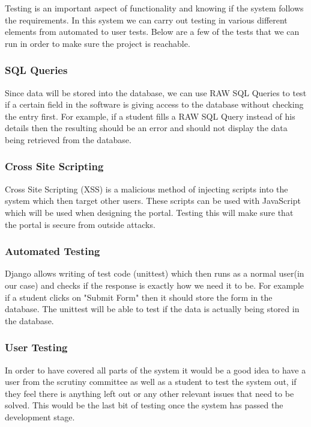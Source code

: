 \documentclass[../main.tex]{subfiles}
\begin{document}
\raggedright

Testing is an important aspect of functionality and knowing if the system follows the requirements. In this system we can carry out testing in various different elements from automated to user tests. Below are a few of the tests that we can run in order to make sure the project is reachable.

\subsubsection{SQL Queries}
Since data will be stored into the database, we can use RAW SQL Queries to test if a certain field in the software is giving access to the database without checking the entry first. For example, if a student fills a RAW SQL Query instead of his details then the resulting should be an error and should not display the data being retrieved from the database. 

\subsubsection{Cross Site Scripting}
Cross Site Scripting (XSS) is a malicious method of injecting scripts into the system which then target other users. These scripts can be used with JavaScript which will be used when designing the portal. Testing this will make sure that the portal is secure from outside attacks. 

\subsubsection{Automated Testing}
Django allows writing of test code (unittest)\cite{djangoTesting} which then runs as a normal user(in our case) and checks if the response is exactly how we need it to be. For example if a student clicks on "Submit Form" then it should store the form in the database. The unittest will be able to test if the data is actually being stored in the database. 

\subsubsection{User Testing}
In order to have covered all parts of the system it would be a good idea to have a user from the scrutiny committee as well as a student to test the system out, if they feel there is anything left out or any other relevant issues that need to be solved. This would be the last bit of testing once the system has passed the development stage.
\end{document}
